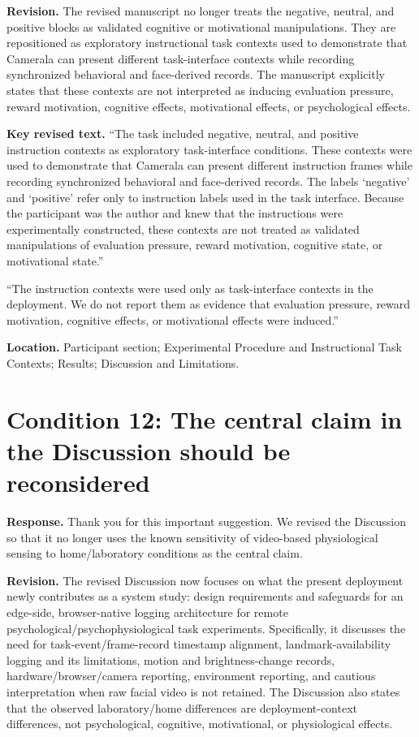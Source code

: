 \documentclass[11pt]{article}
\newcommand{\condition}[2]{\section*{Condition #1: #2}}
\begin{document}
\textbf{Revision.}
The revised manuscript no longer treats the negative, neutral, and positive blocks as validated cognitive or motivational manipulations.
They are repositioned as exploratory instructional task contexts used to demonstrate that Camerala can present different task-interface contexts while recording synchronized behavioral and face-derived records.
The manuscript explicitly states that these contexts are not interpreted as inducing evaluation pressure, reward motivation, cognitive effects, motivational effects, or psychological effects.

\textbf{Key revised text.}
``The task included negative, neutral, and positive instruction contexts as exploratory task-interface conditions.
These contexts were used to demonstrate that Camerala can present different instruction frames while recording synchronized behavioral and face-derived records.
The labels `negative' and `positive' refer only to instruction labels used in the task interface.
Because the participant was the author and knew that the instructions were experimentally constructed, these contexts are not treated as validated manipulations of evaluation pressure, reward motivation, cognitive state, or motivational state.''

``The instruction contexts were used only as task-interface contexts in the deployment.
We do not report them as evidence that evaluation pressure, reward motivation, cognitive effects, or motivational effects were induced.''

\textbf{Location.}
Participant section; Experimental Procedure and Instructional Task Contexts; Results; Discussion and Limitations.

\condition{12}{The central claim in the Discussion should be reconsidered}
\textbf{Response.}
Thank you for this important suggestion.
We revised the Discussion so that it no longer uses the known sensitivity of video-based physiological sensing to home/laboratory conditions as the central claim.

\textbf{Revision.}
The revised Discussion now focuses on what the present deployment newly contributes as a system study: design requirements and safeguards for an edge-side, browser-native logging architecture for remote psychological/psychophysiological task experiments.
Specifically, it discusses the need for task-event/frame-record timestamp alignment, landmark-availability logging and its limitations, motion and brightness-change records, hardware/browser/camera reporting, environment reporting, and cautious interpretation when raw facial video is not retained.
The Discussion also states that the observed laboratory/home differences are deployment-context differences, not psychological, cognitive, motivational, or physiological effects.
\end{document}
